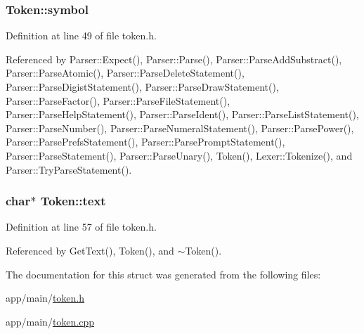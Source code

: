 \subsubsection[{\texorpdfstring{symbol}{symbol}}]{ Token\+::symbol}\hypertarget{structToken_aa671eaaae5632c5277e89a090d864820}{}\label{structToken_aa671eaaae5632c5277e89a090d864820}


Definition at line 49 of file token.\+h.



Referenced by Parser\+::\+Expect(), Parser\+::\+Parse(), Parser\+::\+Parse\+Add\+Substract(), Parser\+::\+Parse\+Atomic(), Parser\+::\+Parse\+Delete\+Statement(), Parser\+::\+Parse\+Digist\+Statement(), Parser\+::\+Parse\+Draw\+Statement(), Parser\+::\+Parse\+Factor(), Parser\+::\+Parse\+File\+Statement(), Parser\+::\+Parse\+Help\+Statement(), Parser\+::\+Parse\+Ident(), Parser\+::\+Parse\+List\+Statement(), Parser\+::\+Parse\+Number(), Parser\+::\+Parse\+Numeral\+Statement(), Parser\+::\+Parse\+Power(), Parser\+::\+Parse\+Prefs\+Statement(), Parser\+::\+Parse\+Prompt\+Statement(), Parser\+::\+Parse\+Statement(), Parser\+::\+Parse\+Unary(), Token(), Lexer\+::\+Tokenize(), and Parser\+::\+Try\+Parse\+Statement().

\subsubsection[{\texorpdfstring{text}{text}}]{\setlength{\rightskip}{0pt plus 5cm}char$\ast$ Token\+::text\hspace{0.3cm}{\ttfamily [private]}}\hypertarget{structToken_ab2d6b41ba04b1a1e272d7e963303f8db}{}\label{structToken_ab2d6b41ba04b1a1e272d7e963303f8db}


Definition at line 57 of file token.\+h.



Referenced by Get\+Text(), Token(), and $\sim$\+Token().



The documentation for this struct was generated from the following files\+:\begin{DoxyCompactItemize}
\item 
app/main/\hyperlink{token_8h}{token.\+h}\item 
app/main/\hyperlink{token_8cpp}{token.\+cpp}\end{DoxyCompactItemize}
